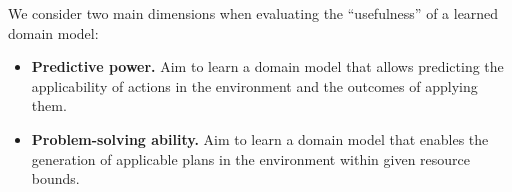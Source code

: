 \documentclass[letterpaper]{article} %
\newif\ifaddcomments
\newcommand{\roni}[1]{\ifaddcomments{\textcolor{red}{[Roni: #1]}}\fi}
\newcommand{\mauro}[1]{\ifaddcomments{\textcolor{green}{[Mauro: #1]}}\fi}
\newcommand{\gregor}[1]{\ifaddcomments{\textcolor{orange}{[Gregor: #1]}}\fi}
\begin{document}
We consider two main dimensions when evaluating the ``usefulness'' of a learned domain model: 
%
\begin{itemize}
    \item \textbf{Predictive power.} Aim to learn a domain model that allows predicting the applicability of actions in the environment and the outcomes of applying them. 
    \item \textbf{Problem-solving ability.} Aim to learn a domain model that enables the generation of applicable plans in the environment within given resource bounds. %
\end{itemize}
\end{document}
